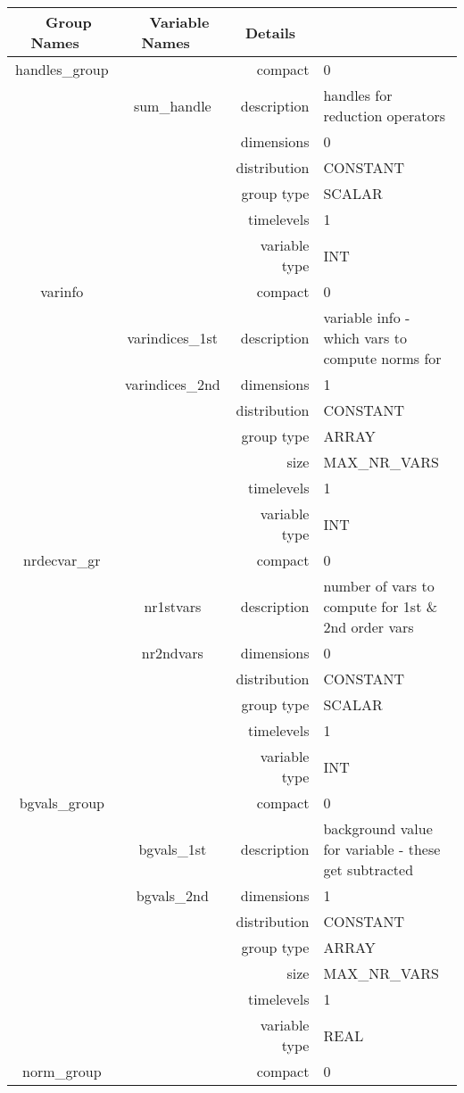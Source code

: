 \begin{tabular*}{150mm}{|c|c@{\extracolsep{\fill}}|rl|} \hline 
~ {\bf Group Names} ~ & ~ {\bf Variable Names} ~  &{\bf Details} ~ & ~\\ 
\hline 
handles\_group &  & compact & 0 \\ 
 & sum\_handle & description & handles for reduction operators \\ 
 &  & dimensions & 0 \\ 
 &  & distribution & CONSTANT \\ 
 &  & group type & SCALAR \\ 
 &  & timelevels & 1 \\ 
 &  & variable type & INT \\ 
\hline 
varinfo &  & compact & 0 \\ 
 & varindices\_1st & description & variable info - which vars to compute norms for \\ 
 & varindices\_2nd & dimensions & 1 \\ 
 &  & distribution & CONSTANT \\ 
 &  & group type & ARRAY \\ 
 &  & size & MAX\_NR\_VARS \\ 
 &  & timelevels & 1 \\ 
 &  & variable type & INT \\ 
\hline 
nrdecvar\_gr &  & compact & 0 \\ 
 & nr1stvars & description & number of vars to compute for 1st \& 2nd order vars \\ 
 & nr2ndvars & dimensions & 0 \\ 
 &  & distribution & CONSTANT \\ 
 &  & group type & SCALAR \\ 
 &  & timelevels & 1 \\ 
 &  & variable type & INT \\ 
\hline 
bgvals\_group &  & compact & 0 \\ 
 & bgvals\_1st & description & background value for variable - these get subtracted \\ 
 & bgvals\_2nd & dimensions & 1 \\ 
 &  & distribution & CONSTANT \\ 
 &  & group type & ARRAY \\ 
 &  & size & MAX\_NR\_VARS \\ 
 &  & timelevels & 1 \\ 
 &  & variable type & REAL \\ 
\hline 
norm\_group &  & compact & 0 \\ 

\end{tabular*}
